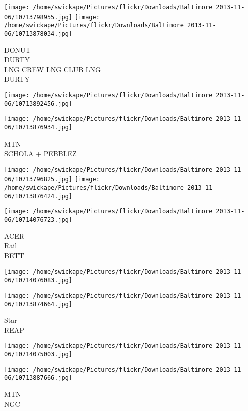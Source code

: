 \documentclass[10pt,letterpaper]{article}
\begin{document}
\texttt{[image: /home/swickape/Pictures/flickr/Downloads/Baltimore 2013-11-06/10713798955.jpg]}
\texttt{[image: /home/swickape/Pictures/flickr/Downloads/Baltimore 2013-11-06/10713878034.jpg]}

DONUT\\
DURTY\\
LNG CREW LNG CLUB LNG\\
DURTY\\
\pagebreak

\texttt{[image: /home/swickape/Pictures/flickr/Downloads/Baltimore 2013-11-06/10713892456.jpg]}

\vspace{0.25in}
\texttt{[image: /home/swickape/Pictures/flickr/Downloads/Baltimore 2013-11-06/10713876934.jpg]}

MTN\\
SCHOLA + PEBBLEZ\\
\pagebreak

\texttt{[image: /home/swickape/Pictures/flickr/Downloads/Baltimore 2013-11-06/10713796825.jpg]}
\texttt{[image: /home/swickape/Pictures/flickr/Downloads/Baltimore 2013-11-06/10713876424.jpg]}

\vspace{0.25in}
\texttt{[image: /home/swickape/Pictures/flickr/Downloads/Baltimore 2013-11-06/10714076723.jpg]}

ACER\\
Rail\\
BETT\\
\pagebreak

\texttt{[image: /home/swickape/Pictures/flickr/Downloads/Baltimore 2013-11-06/10714076083.jpg]}

\vspace{0.25in}
\texttt{[image: /home/swickape/Pictures/flickr/Downloads/Baltimore 2013-11-06/10713874664.jpg]}

Star\\
REAP\\
\pagebreak

\texttt{[image: /home/swickape/Pictures/flickr/Downloads/Baltimore 2013-11-06/10714075003.jpg]}

\vspace{0.25in}
\texttt{[image: /home/swickape/Pictures/flickr/Downloads/Baltimore 2013-11-06/10713887666.jpg]}

MTN\\
NGC\\
\pagebreak
\end{document}
